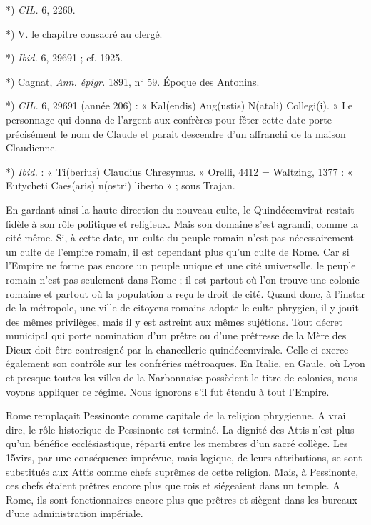 \documentclass[a4paper, 11pt, oneside, polutonikogreek, french]{article}
\begin{document}
*) \emph{CIL.} 6, 2260.

*) V. le chapitre consacré au clergé.

*) \emph{Ibid.} 6, 29691 ; cf. 1925.

*) Cagnat, \emph{Ann. épigr.} 1891, n° 59. Époque des Antonins.

*) \emph{CIL.} 6, 29691 (année 206) : « Kal(endis) Aug(ustis) N(atali) Collegi(i). » Le personnage qui donna de l'argent aux confrères pour fêter cette date porte précisément le nom de Claude et parait descendre d'un affranchi de la maison Claudienne.

*) \emph{Ibid.} : « Ti(berius) Claudius Chresymus. » Orelli, 4412 = Waltzing, 1377 : « Eutycheti Caes(aris) n(ostri) liberto » ; sous Trajan.

En gardant ainsi la haute direction du nouveau culte, le Quindécemvirat restait fidèle à son rôle politique et religieux. Mais son domaine s'est agrandi, comme la cité même. Si, à cette date, un culte du peuple romain n'est pas nécessairement un culte de l'empire romain, il est cependant plus qu'un culte de Rome. Car si l'Empire ne forme pas encore un peuple unique et une cité universelle, le peuple romain n'est pas seulement dans Rome ; il est partout où l'on trouve une colonie romaine et partout où la population a reçu le droit de cité. Quand donc, à l'instar de la métropole, une ville de citoyens romains adopte le culte phrygien, il y jouit des mêmes privilèges, mais il y est astreint aux mêmes sujétions. Tout décret municipal qui porte nomination d'un prêtre ou d'une prêtresse de la Mère des Dieux doit être contresigné par la chancellerie quindécemvirale. Celle-ci exerce également son contrôle sur les confréries métroaques. En Italie, en Gaule, où Lyon et presque toutes les villes de la Narbonnaise possèdent le titre de colonies, nous voyons appliquer ce régime. Nous ignorons s'il fut étendu à tout l'Empire.

Rome remplaçait Pessinonte comme capitale de la religion phrygienne. A vrai dire, le rôle historique de Pessinonte est terminé. La dignité des Attis n'est plus qu'un bénéfice ecclésiastique, réparti entre les membres d'un sacré collège. Les 15virs, par une conséquence imprévue, mais logique, de leurs attributions, se sont substitués aux Attis comme chefs suprêmes de cette religion. Mais, à Pessinonte, ces chefs étaient prêtres encore plus que rois et siégeaient dans un temple. A Rome, ils sont fonctionnaires encore plus que prêtres et siègent dans les bureaux d'une administration impériale.
\end{document}
